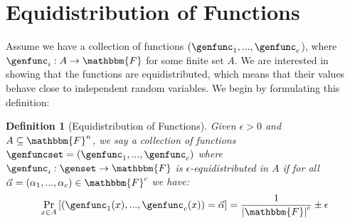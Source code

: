 \documentclass[10pt,a4paper]{article}
\newtheorem{definition}[theorem]{Definition}
\newcommand{\basefield}[0]{\mathbbm{F}}
\newcommand{\blocklength}[0]{n}
\newcommand{\field}[0]{\basefield^{\blocklength}}
\newcommand{\funcdef}[3]{#1:#2\rightarrow#3}
\newcommand{\abs}[1]{\left| #1 \right|}
\newcommand{\prex}[2]{\Pr_{#1}\left[ #2 \right]}
\begin{document}
\section[Equidistribution of Functions]{Equidistribution of Functions}\label{sec:equidistribution-of-functions}
Assume we have a collection of functions $(\genfunc_1,...,\genfunc_c$), where $\funcdef{\genfunc_i}{A}{\basefield}$ for some finite set $A$.
We are interested in showing that the functions are equidistributed, which means that their values behave close to independent random variables.
We begin by formulating this definition:
\begin{definition}[Equidistribution of Functions]
    Given $\epsilon > 0$ and $A \subseteq \field$,
    we say a collection of functions $\genfuncset = (\genfunc_1,...,\genfunc_c)$ where $\funcdef{\genfunc_i}{\genset}{\basefield}$ is $\epsilon$-equidistributed in $A$ if for all $\vec{\alpha} = (\alpha_1,...,\alpha_c) \in \basefield^c$ we have:
    \[
        \prex{x \in A}{(\genfunc_1(x),...,\genfunc_c(x)) = \vec{\alpha}} = \frac{1}{\abs{\basefield}^c} \pm \epsilon
    \]
\end{definition}
\end{document}
